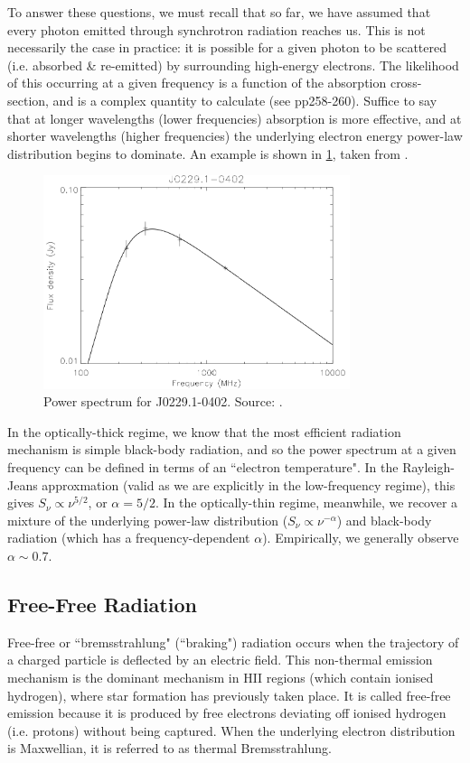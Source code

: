 \pg
To answer these questions, we must recall that so far, we have assumed that every photon emitted through synchrotron radiation reaches us. This is not necessarily the case in practice: it is possible for a given photon to be scattered (i.e. absorbed \& re-emitted) by surrounding high-energy electrons. The likelihood of this occurring at a given frequency is a function of the absorption cross-section, and is a complex quantity to calculate (see   pp258-260). Suffice to say that at longer wavelengths (lower frequencies) absorption is more effective, and at shorter wavelengths (higher frequencies) the underlying electron energy power-law  distribution begins to dominate. An example is shown in \cref{fig.synchrotron}, taken from .

\begin{figure}[!h]
\centering
\includegraphics[width=0.8\textwidth]{images/synchrotron-spectrum.png}
\caption{\label{fig.synchrotron} Power spectrum for J0229.1-0402. Source: .}
\end{figure}

\pg
In the optically-thick regime, we know that the most efficient radiation mechanism is simple black-body radiation, and so the power spectrum at a given frequency can be defined in terms of an ``electron temperature". In the Rayleigh-Jeans approxmation (valid as we are explicitly in the low-frequency regime), this gives $S_\nu \propto \nu^{5/2}$, or $\alpha=5/2$. 
In the optically-thin regime, meanwhile, we recover a mixture of the underlying power-law distribution ($S_\nu \propto \nu^{-\alpha}$) and black-body radiation (which has a frequency-dependent $\alpha$). Empirically, we generally observe $\alpha \sim 0.7$.


\subsection{Free-Free Radiation}
\pg
Free-free or ``bremsstrahlung" (``braking") radiation occurs when the trajectory of a charged particle is deflected by an electric field. This non-thermal emission mechanism is the dominant mechanism in HII regions (which contain ionised hydrogen), where star formation has previously taken place. It is called free-free emission because it is produced by free electrons deviating off ionised hydrogen (i.e. protons) without being captured. When the underlying electron distribution is Maxwellian, it is referred to as thermal Bremsstrahlung.

